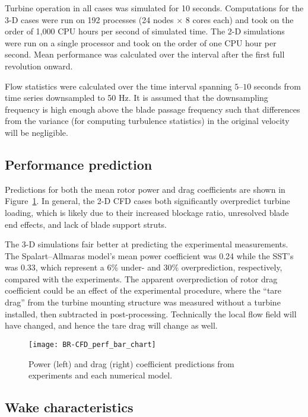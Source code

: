 Turbine operation in all cases was simulated for 10 seconds. Computations for
the 3-D cases were run on 192 processes (24 nodes $\times$ 8 cores each) and
took on the order of 1,000 CPU hours per second of simulated time. The 2-D
simulations were run on a single processor and took on the order of one CPU hour
per second. Mean performance was calculated over the interval after the first
full revolution onward.

Flow statistics were calculated over the time interval spanning $5$--$10$
seconds from time series downsampled to 50 Hz. It is assumed that the
downsampling frequency is high enough above the blade passage frequency such
that differences from the variance (for computing turbulence statistics) in the
original velocity will be negligible.


\subsection{Performance prediction}

Predictions for both the mean rotor power and drag coefficients are shown in
Figure~\ref{fig:br-cfd-perf-bar-chart}. In general, the 2-D CFD cases both
significantly overpredict turbine loading, which is likely due to their
increased blockage ratio, unresolved blade end effects, and lack of blade
support struts.

The 3-D simulations fair better at predicting the experimental measurements. The
Spalart--Allmaras model's mean power coefficient was 0.24 while the SST's was
0.33, which represent a 6\% under- and 30\% overprediction, respectively,
compared with the experiments. The apparent overprediction of rotor drag
coefficient could be an effect of the experimental procedure, where the ``tare
drag'' from the turbine mounting structure was measured without a turbine
installed, then subtracted in post-processing. Technically the local flow field
will have changed, and hence the tare drag will change as well.

\begin{figure}
    \centering

    \texttt{[image: BR-CFD\_perf\_bar\_chart]}

    \caption{Power (left) and drag (right) coefficient predictions from
        experiments and each numerical model.}

    \label{fig:br-cfd-perf-bar-chart}
\end{figure}


\subsection{Wake characteristics}

